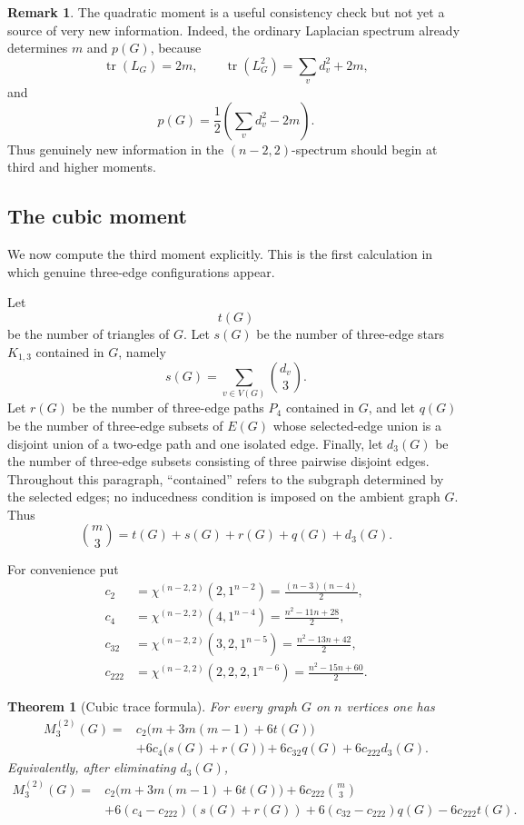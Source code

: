 \documentclass{amsart}
\newtheorem{theorem}{Theorem}
\theoremstyle{definition}
\newtheorem{remark}{Remark}
\newcommand{\tr}{\operatorname{tr}}
\begin{document}
\begin{remark}
The quadratic moment is a useful consistency check but not yet a source
of very new information.  Indeed, the ordinary Laplacian spectrum already
determines $m$ and $p(G)$, because
\[
\tr(L_G)=2m,
\qquad
\tr(L_G^2)=\sum_v d_v^2+2m,
\]
and
\[
p(G)=\frac12\left(\sum_v d_v^2-2m\right).
\]
Thus genuinely new information in the $(n-2,2)$-spectrum should begin at
third and higher moments.
\end{remark}


\subsection{The  cubic moment}

We now compute the third moment explicitly.  This is the first 
calculation in which genuine three-edge configurations appear.

Let
\[
 t(G)
\]
be the number of triangles of $G$.  Let $s(G)$ be the number of three-edge
stars $K_{1,3}$ contained in $G$, namely
\[
s(G)=\sum_{v\in V(G)}\binom{d_v}{3}.
\]
Let $r(G)$ be the number of three-edge paths $P_4$ contained in $G$, and
let $q(G)$ be the number of three-edge subsets of $E(G)$ whose selected-edge
union is a disjoint union of a two-edge path and one isolated edge.  Finally,
let $d_3(G)$ be the number of three-edge subsets consisting of three pairwise
disjoint edges.  Throughout this paragraph, ``contained'' refers to the
subgraph determined by the selected edges; no inducedness condition is
imposed on the ambient graph $G$.
Thus
\[
\binom m3=t(G)+s(G)+r(G)+q(G)+d_3(G).
\]

For convenience put
\[
\begin{aligned}
 c_2&=\chi^{(n-2,2)}(2,1^{n-2})=\frac{(n-3)(n-4)}2,\\
 c_4&=\chi^{(n-2,2)}(4,1^{n-4})=\frac{n^2-11n+28}{2},\\
 c_{32}&=\chi^{(n-2,2)}(3,2,1^{n-5})=\frac{n^2-13n+42}{2},\\
 c_{222}&=\chi^{(n-2,2)}(2,2,2,1^{n-6})=\frac{n^2-15n+60}{2}.
\end{aligned}
\]

\begin{theorem}[Cubic trace formula]
For every graph $G$ on $n$ vertices one has
\[
\begin{aligned}
M_3^{(2)}(G)
={}&c_2\bigl(m+3m(m-1)+6t(G)\bigr) \\
&+6c_4\bigl(s(G)+r(G)\bigr)
 +6c_{32}q(G)+6c_{222}d_3(G).
\end{aligned}
\tag{7.3}
\]
Equivalently, after eliminating $d_3(G)$,
\[
\begin{aligned}
M_3^{(2)}(G)
={}&c_2\bigl(m+3m(m-1)+6t(G)\bigr)
+6c_{222}\binom m3 \\
&+6(c_4-c_{222})(s(G)+r(G))
 +6(c_{32}-c_{222})q(G)
 -6c_{222}t(G).
\end{aligned}
\tag{7.4}
\]
\end{theorem}
\end{document}
